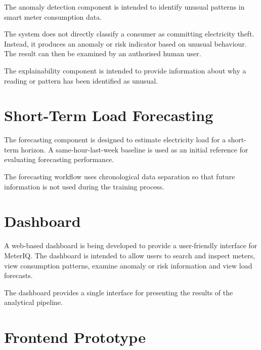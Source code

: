 \documentclass[12pt,a4paper]{report}
\begin{document}
The anomaly detection component is intended to identify unusual patterns in
smart meter consumption data.

The system does not directly classify a consumer as committing electricity
theft. Instead, it produces an anomaly or risk indicator based on unusual
behaviour. The result can then be examined by an authorised human user.

The explainability component is intended to provide information about why a
reading or pattern has been identified as unusual.


\section{Short-Term Load Forecasting}

The forecasting component is designed to estimate electricity load for a
short-term horizon. A same-hour-last-week baseline is used as an initial
reference for evaluating forecasting performance.

The forecasting workflow uses chronological data separation so that future
information is not used during the training process.


\section{Dashboard}

A web-based dashboard is being developed to provide a user-friendly
interface for MeterIQ. The dashboard is intended to allow users to search and
inspect meters, view consumption patterns, examine anomaly or risk
information and view load forecasts.

The dashboard provides a single interface for presenting the results of the
analytical pipeline.



\needspace{0.25\textheight}

\section{Frontend Prototype}
\end{document}
